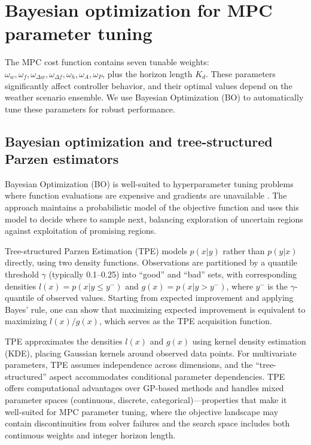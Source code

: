 \documentclass[preprint,12pt]{elsarticle}
\begin{document}
\section{Bayesian optimization for MPC parameter tuning}\label{sec:bo}

The MPC cost function contains seven tunable weights: $\omega_w, \omega_f, \omega_{\Delta w}, \omega_{\Delta f}, \omega_h, \omega_A, \omega_P$, plus the horizon length $K_{d}$. These parameters significantly affect controller behavior, and their optimal values depend on the weather scenario ensemble. We use Bayesian Optimization (BO) to automatically tune these parameters for robust performance.

\subsection{Bayesian optimization and tree-structured Parzen estimators}\label{subsec:bo-overview}

Bayesian Optimization (BO) is well-suited to hyperparameter tuning problems where function evaluations are expensive and gradients are unavailable \cite{shahriari2016taking}. The approach maintains a probabilistic model of the objective function and uses this model to decide where to sample next, balancing exploration of uncertain regions against exploitation of promising regions.

Tree-structured Parzen Estimation (TPE) \cite{bergstra2011algorithms} models $p(x|y)$ rather than $p(y|x)$ directly, using two density functions. Observations are partitioned by a quantile threshold $\gamma$ (typically 0.1--0.25) into ``good'' and ``bad'' sets, with corresponding densities $l(x) = p(x|y\leq y^{-})$ and $g(x) = p(x|y > y^{-})$, where $y^{-}$ is the $\gamma$-quantile of observed values. Starting from expected improvement and applying Bayes' rule, one can show that maximizing expected improvement is equivalent to maximizing $l(x)/g(x)$, which serves as the TPE acquisition function.

TPE approximates the densities $l(x)$ and $g(x)$ using kernel density estimation (KDE), placing Gaussian kernels around observed data points. For multivariate parameters, TPE assumes independence across dimensions, and the ``tree-structured'' aspect accommodates conditional parameter dependencies. TPE offers computational advantages over GP-based methods and handles mixed parameter spaces (continuous, discrete, categorical)---properties that make it well-suited for MPC parameter tuning, where the objective landscape may contain discontinuities from solver failures and the search space includes both continuous weights and integer horizon length.
\end{document}
